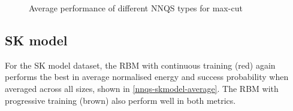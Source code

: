 \begin{figure}[!htb]
    \centering
    \caption{Average performance of different NNQS types for max-cut}
    \label{nnqs-maxcut-average}
\end{figure}

\subsection{SK model}
For the SK model dataset, the RBM with continuous training (red) again performs the best in average normalised energy and success probability when averaged across all sizes, shown in \autoref{nnqs-skmodel-average}. The RBM with progressive training (brown) also perform well in both metrics.

